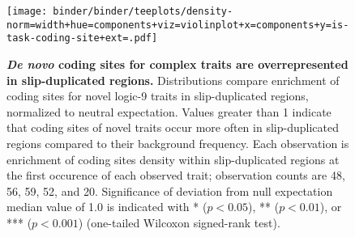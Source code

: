 \begin{figure}
\texttt{[image: binder/binder/teeplots/density-norm=width+hue=components+viz=violinplot+x=components+y=is-task-coding-site+ext=.pdf]}
\caption{%
  \textbf{\textit{De novo} coding sites for complex traits are overrepresented in slip-duplicated regions.}
  \footnotesize
  Distributions compare enrichment of coding sites for novel logic-9 traits in slip-duplicated regions, normalized to neutral expectation.
  Values greater than 1 indicate that coding sites of novel traits occur more often in slip-duplicated regions compared to their background frequency.
  Each observation is enrichment of coding sites density within slip-duplicated regions at the first occurence of each observed trait; observation counts are 48, 56, 59, 52, and 20.
  Significance of deviation from null expectation median value of 1.0 is indicated with * ($p < 0.05$), ** ($p < 0.01$), or *** ($p < 0.001$) (one-tailed Wilcoxon signed-rank test).
} \label{fig:potentiation}
\end{figure}
